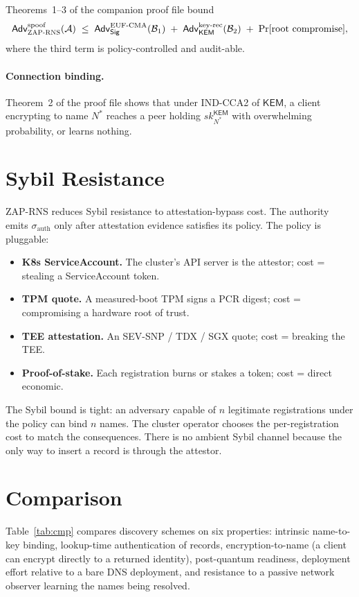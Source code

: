 \documentclass[11pt,a4paper]{article}
\theoremstyle{definition}
\theoremstyle{remark}
\newcommand{\KEM}{\mathsf{KEM}}
\newcommand{\Sig}{\mathsf{Sig}}
\newcommand{\Adv}{\mathsf{Adv}}
\newcommand{\sk}{\mathit{sk}}
\newcommand{\RNS}{\textsc{ZAP-RNS}}
\begin{document}
Theorems~1--3 of the companion proof file bound
\[
\Adv^{\mathrm{spoof}}_{\RNS}(\mathcal{A}) \;\le\;
\Adv^{\mathrm{EUF\text{-}CMA}}_{\Sig}(\mathcal{B}_1) \;+\;
\Adv^{\mathrm{key\text{-}rec}}_{\KEM}(\mathcal{B}_2) \;+\;
\Pr[\text{root compromise}],
\]
where the third term is policy-controlled and audit-able.

\paragraph{Connection binding.} Theorem~2 of the proof file shows
that under IND-CCA2 of $\KEM$, a client encrypting to name $N^*$
reaches a peer holding $\sk_{N^*}^\KEM$ with overwhelming probability,
or learns nothing.

\section{Sybil Resistance}\label{sec:sybil}

\RNS{} reduces Sybil resistance to attestation-bypass cost. The
authority emits $\sigma_{\mathrm{auth}}$ only after attestation evidence
satisfies its policy. The policy is pluggable:
\begin{itemize}[leftmargin=*]
\item \textbf{K8s ServiceAccount.} The cluster's API server is the
attestor; cost = stealing a ServiceAccount token.
\item \textbf{TPM quote.} A measured-boot TPM signs a PCR digest;
cost = compromising a hardware root of trust.
\item \textbf{TEE attestation.} An SEV-SNP / TDX / SGX quote;
cost = breaking the TEE.
\item \textbf{Proof-of-stake.} Each registration burns or stakes a
token; cost = direct economic.
\end{itemize}

The Sybil bound is tight: an adversary capable of $n$ legitimate
registrations under the policy can bind $n$ names. The cluster operator
chooses the per-registration cost to match the consequences. There is
no ambient Sybil channel because the only way to insert a record is
through the attestor.

\section{Comparison}\label{sec:cmp}

Table~\ref{tab:cmp} compares discovery schemes on six properties:
intrinsic name-to-key binding, lookup-time authentication of records,
encryption-to-name (a client can encrypt directly to a returned
identity), post-quantum readiness, deployment effort relative to a bare
DNS deployment, and resistance to a passive network observer learning
the names being resolved.
\end{document}
